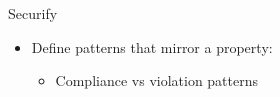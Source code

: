 \begin{frame}{Securify~\cite{bib:securify}}
\begin{itemize}
\item Define patterns that mirror a property:
\begin{itemize}
\item Compliance vs violation patterns
\end{itemize}
\end{itemize}
\end{frame}